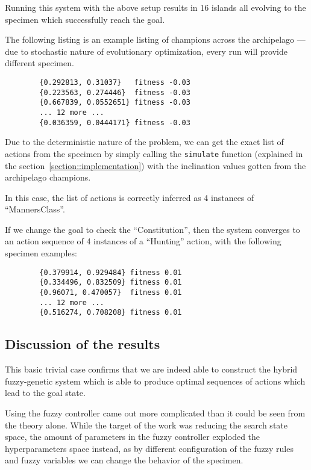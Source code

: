\documentclass[12pt, a4paper]{article}
\begin{document}
	Running this system with the above setup results in 16 islands all evolving to the specimen which successfully reach the goal.
	
	The following listing is an example listing of champions across the archipelago --- due to stochastic nature of evolutionary optimization, every run will provide different specimen.
	
	\begin{verbatim}
		{0.292813, 0.31037}   fitness -0.03
		{0.223563, 0.274446}  fitness -0.03
		{0.667839, 0.0552651} fitness -0.03
		... 12 more ...
		{0.036359, 0.0444171} fitness -0.03
	\end{verbatim}
	
	Due to the deterministic nature of the problem, we can get the exact list of actions from the specimen by simply calling the \texttt{simulate} function (explained in the section~\ref{section::implementation}) with the inclination values gotten from the archipelago champions.
	
	In this case, the list of actions is correctly inferred as 4 instances of ``MannersClass''.
	
	If we change the goal to check the ``Constitution'', then the system converges to an action sequence of 4 instances of a ``Hunting'' action, with the following specimen examples:
	
	\begin{verbatim}
		{0.379914, 0.929484} fitness 0.01
		{0.334496, 0.832509} fitness 0.01
		{0.96071, 0.470057}  fitness 0.01
		... 12 more ...
		{0.516274, 0.708208} fitness 0.01
	\end{verbatim}
	
	
	\subsection{Discussion of the results}
		
	This basic trivial case confirms that we are indeed able to construct the hybrid fuzzy-genetic system which is able to produce optimal sequences of actions which lead to the goal state.
		
	Using the fuzzy controller came out more complicated than it could be seen from the theory alone.
	While the target of the work was reducing the search state space, the amount of parameters in the fuzzy controller exploded the hyperparameters space instead, as by different configuration of the fuzzy rules and fuzzy variables we can change the behavior of the specimen.
	
\end{document}
